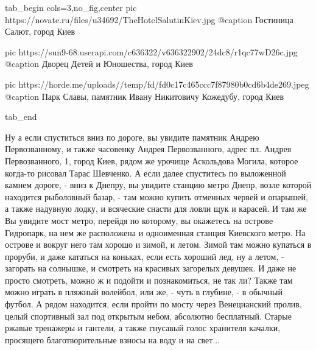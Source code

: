 \ifcmt
  tab_begin cols=3,no_fig,center
		 pic https://novate.ru/files/u34692/TheHotelSalutinKiev.jpg
		 @caption Гостиница Салют, город Киев

		 pic https://sun9-68.userapi.com/c636322/v636322902/24dc8/r1qc77wD26c.jpg
		 @caption Дворец Детей и Юношества, город Киев

		 pic https://horde.me/uploads//temp/fd/fd0c17c465ccc7f87980b0cd6b4de269.jpeg
		 @caption Парк Славы, памятник Ивану Никитовичу Кожедубу, город Киев

  tab_end
\fi

Ну а если спуститься вниз
по дороге, вы увидите памятник Андрею Первозванному, и также часовенку Андрея
Первозванного, адрес пл. Андрея Первозванного, 1, город Киев, рядом же урочище
Аскольдова Могила, которое когда-то рисовал Тарас Шевченко. А если далее
спуститесь по выложенной камнем дороге, - вниз к Днепру, вы увидите станцию
метро Днепр, возле которой находится рыболовный базар, - там можно купить
отменных червей и опарышей, а также надувную лодку, и всяческие снасти для
ловли щук и карасей.  И там же Вы увидите мост метро, перейдя по которому, вы
окажетесь на острове Гидропарк, на нем же расположена и одноименная станция
Киевского метро. На острове и вокруг него там хорошо и зимой, и летом. Зимой
там можно купаться в проруби, и даже кататься на коньках, если есть хороший
лед, ну а летом, - загорать на солнышке, и смотреть на красивых загорелых
девушек. И даже не просто смотреть, можно ж и подойти и познакомиться, не так
ли? Также там можно играть в пляжный волейбол, или же, - чуть в глубине, - в обычный футбол. 
А рядом находится, если пройти по мосту через Венецианский пролив, целый
спортивный зал под открытым небом, абсолютно бесплатный. Старые ржавые
тренажеры и гантели, а также гнусавый голос хранителя качалки, просящего
благотворительные взносы на воду и на свет...

